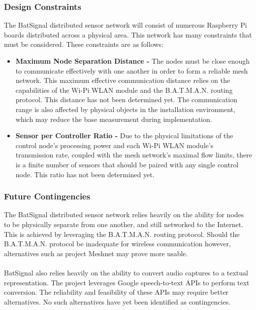 \documentclass[11pt,a4paper]{article}
\begin{document}
\subsubsection{Design Constraints}
The BatSignal distributed sensor network will consist of numerous Raspberry Pi boards distributed across a physical area. This network has many constraints that must be considered. These constraints are as follows:
\begin{itemize}
	\item{\textbf{Maximum Node Separation Distance -}}
		The nodes must be close enough to communicate effectively with one another in order to form a reliable mesh network. This maximum effective communication distance relies on the capabilities of the Wi-Pi WLAN module and the B.A.T.M.A.N. routing protocol. This distance has not been determined yet.	The communication range is also affected by physical objects in the installation environment, which may reduce the base measurement during implementation.
	\item{\textbf{Sensor per Controller Ratio -}}
		Due to the physical limitations of the control node's processing power and each Wi-Pi WLAN module's transmission rate, coupled with the mesh network's maximal flow limits, there is a finite number of sensors that should be paired with any single control node. This ratio has not been determined yet.
\end{itemize}


\subsubsection{Future Contingencies}
The BatSignal distributed sensor network relies heavily on the ability for nodes to be physically separate from one another, and still networked to the Internet. This is achieved by leveraging the B.A.T.M.A.N. routing protocol. Should the B.A.T.M.A.N. protocol be inadequate for wireless communication however, alternatives such as project Meshnet may prove more usable. \\\\
BatSignal also relies heavily on the ability to convert audio captures to a textual representation. The project leverages Google speech-to-text APIs to perform text conversion. The reliability and feasibility of these APIs may require better alternatives. No such alternatives have yet been identified as contingencies.
\end{document}
